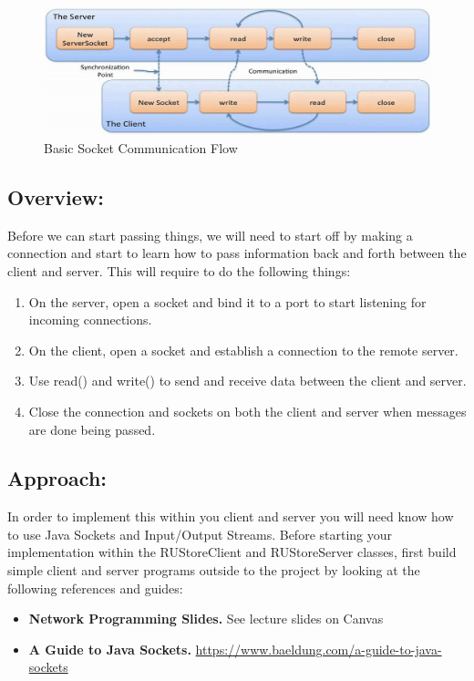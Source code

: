 \documentclass{article}
\begin{document}
\begin{figure}[h]
\vspace{0.2cm}
\hspace{-0.8cm}
\includegraphics[width=14cm]{images/javasocket}
\centering
\caption{Basic Socket Communication Flow}
\vspace{-0.3cm}
\end{figure}

\subsection*{Overview:}
Before we can start passing things, we will need to start off by making a connection and start to learn how to pass information back and forth between the client and server. This will require to do the following things:
\begin{enumerate}
    \item On the server, open a socket and bind it to a port to start listening for incoming connections.
    \item On the client, open a socket and establish a connection to the remote server. 
    \item Use read() and write() to send and receive data between the client and server.
    \item Close the connection and sockets on both the client and server when messages are done being passed. 
\end{enumerate}

\subsection*{Approach:}
In order to implement this within you client and server you will need know how to use Java Sockets and Input/Output Streams. Before starting your implementation within the RUStoreClient and RUStoreServer classes, first build simple client and server programs outside to the project by looking at the following references and guides:

\begin{itemize}
    \item \textbf{Network Programming Slides.} See lecture slides on Canvas
    \item \textbf{A Guide to Java Sockets.} \href{https://www.baeldung.com/a-guide-to-java-sockets}{https://www.baeldung.com/a-guide-to-java-sockets}
\end{itemize}
\end{document}
